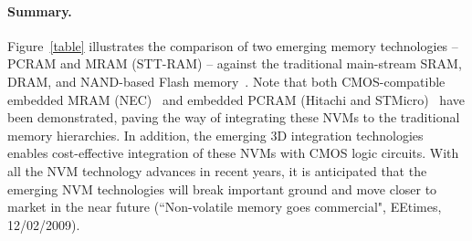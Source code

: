 \paragraph{Summary.} Figure~\ref{table} illustrates the comparison of
two emerging memory technologies -- PCRAM and MRAM (STT-RAM)  --
against the traditional main-stream SRAM, DRAM, and NAND-based Flash memory~\cite{ITRS07}.
Note that both CMOS-compatible embedded MRAM (NEC)~\cite{MRAM:NEC09} and embedded PCRAM (Hitachi and STMicro)~\cite{PRAM:Hitachi2007,PRAM:ST2004} have been demonstrated, paving the way of integrating
these NVMs to the traditional memory hierarchies. In addition, the emerging 3D integration technologies~\cite{xie:jetcs06,Xie:dac08}
enables cost-effective integration of these NVMs with CMOS logic circuits. With all the NVM technology advances in recent years, it is anticipated that the emerging NVM technologies will break important ground and move closer to market in the near future (``Non-volatile memory goes commercial", EEtimes, 12/02/2009).


